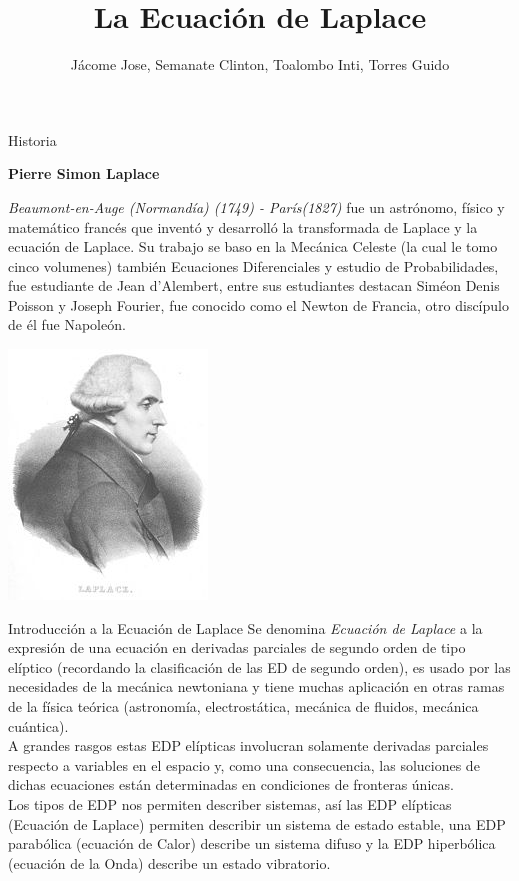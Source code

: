 \documentclass[11pt]{beamer}
\author{Jácome Jose, Semanate Clinton, Toalombo Inti, Torres Guido}
\title{La Ecuación de Laplace}
\begin{document}
\begin{frame}
\titlepage
\end{frame}


\begin{frame}{Historia}

\begin{center}
\textbf{Pierre Simon Laplace}
\end{center}

\textit{Beaumont-en-Auge (Normandía) (1749) - París(1827)} fue un astrónomo, físico y matemático francés que inventó y desarrolló la transformada de Laplace y la ecuación de Laplace. Su trabajo se baso en la Mecánica Celeste (la cual le tomo cinco volumenes) también Ecuaciones Diferenciales y estudio de Probabilidades, fue estudiante de Jean d'Alembert, entre sus estudiantes destacan Siméon Denis Poisson y Joseph Fourier, fue conocido como el Newton de Francia, otro discípulo de él fue Napoleón.
\begin{center}
\includegraphics[scale=1.2]{Laplace.jpg}
\end{center}
\end{frame}

\begin{frame}{Introducción a la Ecuación de Laplace}
Se denomina \textit{Ecuación de Laplace} a la expresión de una ecuación en derivadas parciales de segundo orden de tipo elíptico (recordando la clasificación de las ED de segundo orden), es usado por las necesidades de la mecánica newtoniana y tiene muchas aplicación en otras ramas de la física teórica (astronomía, electrostática, mecánica de fluidos, mecánica cuántica).\\

A grandes rasgos estas EDP elípticas involucran solamente derivadas parciales respecto a variables en el espacio y, como una consecuencia, las soluciones de dichas ecuaciones están determinadas en condiciones de fronteras únicas.\\

Los tipos de EDP nos permiten describer sistemas, así las EDP elípticas (Ecuación de Laplace) permiten describir un sistema de estado estable, una EDP parabólica (ecuación de Calor) describe un sistema difuso y la EDP hiperbólica (ecuación de la Onda) describe un estado vibratorio.

\end{frame}
\end{document}
